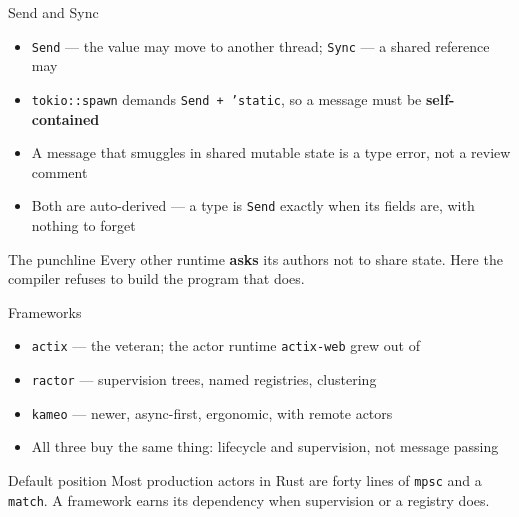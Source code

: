 \begin{frame}{Send and Sync}
  \begin{itemize}
    \item \texttt{Send} --- the value may move to another thread; \texttt{Sync} --- a shared reference may
    \item \texttt{tokio::spawn} demands \texttt{Send + 'static}, so a message must be \textbf{self-contained}
    \item A message that smuggles in shared mutable state is a type error, not a review comment
    \item Both are auto-derived --- a type is \texttt{Send} exactly when its fields are, with nothing to forget
  \end{itemize}
  \vspace{0.2cm}
  \begin{exampleblock}{The punchline}
    Every other runtime \textbf{asks} its authors not to share state.
    Here the compiler refuses to build the program that does.
  \end{exampleblock}
\end{frame}

\begin{frame}{Frameworks}
  \begin{itemize}
    \item \texttt{actix} --- the veteran; the actor runtime \texttt{actix-web} grew out of
    \item \texttt{ractor} --- supervision trees, named registries, clustering
    \item \texttt{kameo} --- newer, async-first, ergonomic, with remote actors
    \item All three buy the same thing: lifecycle and supervision, not message passing
  \end{itemize}
  \vspace{0.2cm}
  \begin{block}{Default position}
    Most production actors in Rust are forty lines of \texttt{mpsc} and a
    \texttt{match}. A framework earns its dependency when supervision or a
    registry does.
  \end{block}
\end{frame}

